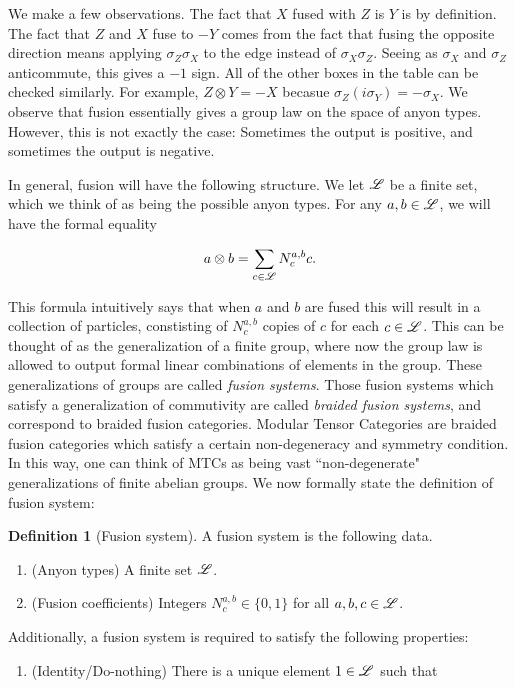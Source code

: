 \documentclass{article}
\theoremstyle{definition}
\newtheorem*{definition}{Definition}
\numberwithin{figure}{section}
\begin{document}
\begin{enumerate}[\thesection .1.]
We make a few observations. The fact that $X$ fused with $Z$ is $Y$ is by definition. The fact that $Z$ and $X$ fuse to $-Y$ comes from the fact that fusing the opposite direction means applying $\sigma_Z\sigma_X$ to the edge instead of $\sigma_X\sigma_Z$. Seeing as $\sigma_X$ and $\sigma_Z$ anticommute, this gives a $-1$ sign. All of the other boxes in the table can be checked similarly. For example, $Z\otimes Y=-X$ becasue $\sigma_Z(i\sigma_Y)=-\sigma_X$. We observe that fusion essentially gives a group law on the space of anyon types. However, this is not exactly the case: Sometimes the output is positive, and sometimes the output is negative.

In general, fusion will have the following structure. We let $\mathscr{L}$ be a finite set, which we think of as being the possible anyon types. For any $a,b\in \mathscr{L}$, we will have the formal equality

$$a\otimes b=\sum_{c\in \mathscr{L}}N_{c}^{a,b}c.$$

This formula intuitively says that when $a$ and $b$ are fused this will result in a collection of particles, constisting of $N_c^{a,b}$ copies of $c$ for each $c\in \mathscr{L}$. This can be thought of as the generalization of a finite group, where now the group law is allowed to output formal linear combinations of elements in the group. These generalizations of groups are called \textit{fusion systems}. Those fusion systems which satisfy a generalization of commutivity are called \textit{braided fusion systems}, and correspond to braided fusion categories. Modular Tensor Categories are braided fusion categories which satisfy a certain non-degeneracy and symmetry condition. In this way, one can think of MTCs as being vast ``non-degenerate" generalizations of finite abelian groups. We now formally state the definition of fusion system:


\begin{definition}[Fusion system] A fusion system is the following data.

\begin{enumerate}
\item (Anyon types) A finite set $\mathscr{L}$.
\item (Fusion coefficients) Integers $N_{c}^{a,b}\in\{0,1\}$ for all $a,b,c\in \mathscr{L}$.
\end{enumerate}

Additionally, a fusion system is required to satisfy the following properties:

\begin{enumerate}
\item (Identity/Do-nothing) There is a unique element $1\in \mathscr{L}$ such that


\end{enumerate}
\end{definition}
\end{enumerate}
\end{document}
